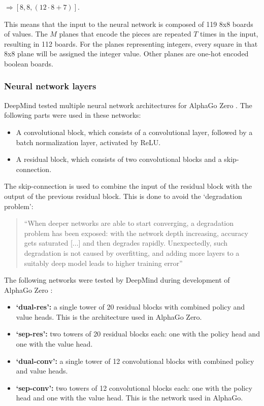 \documentclass{article}
\begin{document}
$\Rightarrow [8 , 8 , (12 \cdot 8 + 7)]$. 

This means that the input to the neural network is composed of 119 8x8 boards of values.
The $M$ planes that encode the pieces are repeated $T$ times in the input, resulting in 112 boards.
For the planes representing integers, every square in that 8x8 plane will be assigned the integer value.
Other planes are one-hot encoded boolean boards.

\subsubsection{Neural network layers}

DeepMind tested multiple neural network architectures for AlphaGo Zero \cite{NeuralNetworksChessprogramming}. 
The following parts were used in these networks:

\begin{itemize}
    \item A convolutional block, which consists of a convolutional layer, followed by a batch normalization layer, activated by ReLU.
    \item A residual block, which consists of two convolutional blocks and a skip-connection.
\end{itemize}

The skip-connection is used to combine the input of the residual block with the output of the previous residual block.
This is done to avoid the `degradation problem':

\begin{quotation}
    ``When deeper networks are able to start converging, a degradation problem has been exposed: 
    with the network depth increasing, accuracy gets saturated [...] and then degrades rapidly. 
    Unexpectedly, such degradation is not caused by overfitting, 
    and adding more layers to a suitably deep model leads to higher training error'' \cite{heDeepResidualLearning2015}
\end{quotation}

The following networks were tested by DeepMind during development of AlphaGo Zero \cite{MasteringGameZero}:

\begin{itemize}
    \item \textbf{`dual-res':} a single tower of 20 residual blocks with combined policy and value heads. This is the architecture used in AlphaGo Zero.
    \item \textbf{`sep-res':} two towers of 20 residual blocks each: one with the policy head and one with the value head.
    \item \textbf{`dual-conv':} a single tower of 12 convolutional blocks with combined policy and value heads.
    \item \textbf{`sep-conv':} two towers of 12 convolutional blocks each: one with the policy head and one with the value head. This is the network used in AlphaGo.
\end{itemize}
\end{document}

